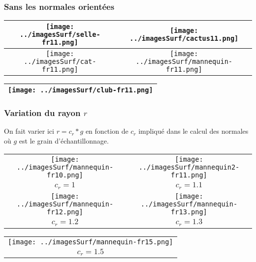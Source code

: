 \documentclass[11pt,a4paper]{article}
\begin{document}
\pagebreak

\subsubsection{Sans les normales orientées}
\begin{center}
\begin{tabular}{|c|c|}
\hline
\texttt{[image: ../imagesSurf/selle-fr11.png]} & \texttt{[image: ../imagesSurf/cactus11.png]}\\
\hline
\texttt{[image: ../imagesSurf/cat-fr11.png]}   & \texttt{[image: ../imagesSurf/mannequin-fr11.png]}\\
\hline
\end{tabular}
\begin{tabular}{|c|}
\hline
\texttt{[image: ../imagesSurf/club-fr11.png]}\\
\hline
\end{tabular}
\end{center}

\pagebreak

\subsubsection{Variation du rayon $r$}
On fait varier ici $r=c_r*g$ en fonction de $c_r$ impliqué dans le calcul des normales où $g$ est le grain d'échantillonnage.

\begin{center}
\begin{tabular}{|c|c|}
\hline
\texttt{[image: ../imagesSurf/mannequin-fr10.png]} & \texttt{[image: ../imagesSurf/mannequin2-fr11.png]}\\
$c_r=1$                                                       & $c_r=1.1$\\
\hline
\texttt{[image: ../imagesSurf/mannequin-fr12.png]} & \texttt{[image: ../imagesSurf/mannequin-fr13.png]}\\
$c_r=1.2$                                                     & $c_r=1.3$\\
\hline
\end{tabular}
\begin{tabular}{|c|}
\hline
\texttt{[image: ../imagesSurf/mannequin-fr15.png]}\\
$c_r=1.5$  \\
\hline
\end{tabular}
\end{center}
\end{document}

